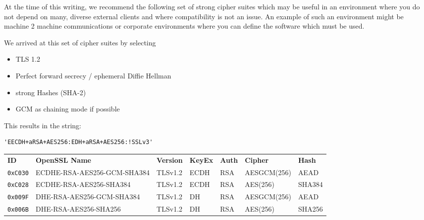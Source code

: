 At the time of this writing, we recommend the following set of strong cipher
suites which may be useful in an environment where you do not depend on many,
diverse external clients and where compatibility is not an issue.  An example
of such an environment might be machine 2 machine communications or corporate
environments where you can define the software which must be used.


We arrived at this set of cipher suites by selecting

\begin{itemize}
\item TLS 1.2
\item Perfect forward secrecy / ephemeral Diffie Hellman
\item strong Hashes (SHA-2)
\item GCM as chaining mode if possible 
\end{itemize}

This results in the string:

\begin{lstlisting}[breaklines]
'EECDH+aRSA+AES256:EDH+aRSA+AES256:!SSLv3'
\end{lstlisting}

%



\begin{center}

\begin{tabular}{lllllll}
\toprule
\textbf{ID}   & \textbf{OpenSSL Name}       & \textbf{Version} & \textbf{KeyEx} & \textbf{Auth} & \textbf{Cipher} & \textbf{Hash}\\\cmidrule(lr){1-7}
\verb|0xC030| & ECDHE-RSA-AES256-GCM-SHA384 & TLSv1.2          & ECDH           &  RSA          & AESGCM(256)     & AEAD         \\
\verb|0xC028| & ECDHE-RSA-AES256-SHA384     & TLSv1.2          & ECDH           &  RSA          & AES(256)        & SHA384       \\
\verb|0x009F| & DHE-RSA-AES256-GCM-SHA384   & TLSv1.2          & DH             &  RSA          & AESGCM(256)     & AEAD         \\
\verb|0x006B| & DHE-RSA-AES256-SHA256       & TLSv1.2          & DH             &  RSA          & AES(256)        & SHA256       \\
\bottomrule
\end{tabular}
\end{center}



